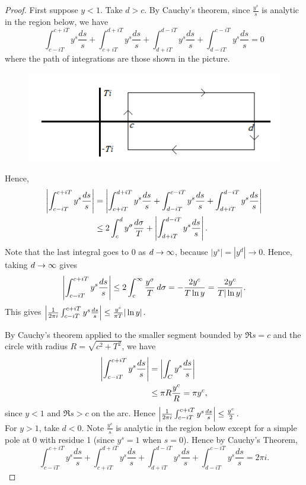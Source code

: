 \begin{proof}
First suppose $y< 1$. Take $d>c$. By Cauchy's theorem, since $\frac{y^s}{s}$ is analytic in the region below, we have
\[
\int_{c-iT}^{c+iT} y^s\frac{ds}{s}+\int_{c+iT}^{d+iT} y^s\frac{ds}{s}+\int_{d+iT}^{d-iT} y^s\frac{ds}{s}+\int_{d-iT}^{c-iT} y^s\frac{ds}{s}=0
\]
where the path of integrations are those shown in the picture.
\begin{figure}[h!]
\centering
\includegraphics{analytic-chapters/dir-c1.png}
\end{figure}

Hence,
\begin{align*}
\left| {\int_{c-iT}^{c+iT}y^s\frac{ds}{s}} \right|
&=\left| {\int_{c+iT}^{d+iT} y^s\frac{ds}{s}+\int_{d-iT}^{c-iT} y^s\frac{ds}{s}+\int_{d+iT}^{d-iT} y^s\frac{ds}{s}} \right|\\
&\le 2\int_c^d y^{\sigma}\frac{d\sigma}{T}+\left| {\int_{d+iT}^{d-iT} y^s\frac{ds}{s}} \right|.
\end{align*}
Note that the last integral goes to 0 as $d\to \infty$, because $|y^s|=|y^d|\to 0$. Hence, taking $d\to \infty$ gives
\[
\left| {\int_{c-iT}^{c+iT}y^s\frac{ds}{s}} \right|
\le 2\int_c^{\infty} \frac{y^{\sigma}}{T}\,d\sigma=-\frac{2y^c}{T\ln y}=\frac{2y^c}{T|\ln y|}.
\]
This gives $\left| {\frac{1}{2\pi i}\int_{c-iT}^{c+iT} y^s\frac{ds}{s}} \right|\le \frac{y^c}{\pi T}{|\ln y|}$.

By Cauchy's theorem applied to the smaller segment bounded by $\Re s=c$ and the circle with radius $R=\sqrt{c^2+T^2}$,   we have
\begin{align*}
\left| {\int_{c-iT}^{c+iT} y^s\frac{ds}{s}} \right|
&= \left| {\int_C y^s\frac{ds}{s}} \right|\\
&\le \pi R\frac{y^{c}}{R}=\pi y^c,
\end{align*}
since $y<1$ and $\Re s>c$ on the arc. Hence $\left| {\frac{1}{2\pi i}\int_{c-iT}^{c+iT} y^s\frac{ds}{s}} \right|\le \frac{y^c}2$.\\

For $y>1$, take $d<0$. Note $\frac{y^s}{s}$ is analytic in the region below except for a simple pole at 0 with residue 1 (since $y^s=1$ when $s=0$). Hence by Cauchy's Theorem,
\[
\int_{c-iT}^{c+iT} y^s\frac{ds}{s}+\int_{c+iT}^{d+iT} y^s\frac{ds}{s}+\int_{d+iT}^{d-iT} y^s\frac{ds}{s}+\int_{d-iT}^{c-iT} y^s\frac{ds}{s}=2\pi i.
\]


\end{proof}
